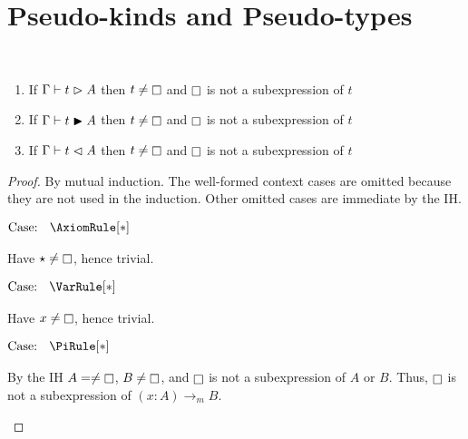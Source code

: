 \section{Pseudo-kinds and Pseudo-types}

\begin{lemma}
    \textcolor{white}{\_}
    \begin{enumerate}
        \item If $\Gamma \vdash t \vartriangleright A$ then $t \neq \kind$ and $\kind$ is not a subexpression of $t$
        \item If $\Gamma \vdash t \blacktriangleright A$ then $t \neq \kind$ and $\kind$ is not a subexpression of $t$
        \item If $\Gamma \vdash t \vartriangleleft A$ then $t \neq \kind$ and $\kind$ is not a subexpression of $t$
    \end{enumerate}
    \label{lem:2:kind_not_proof}
\end{lemma}
\begin{proof}
    By mutual induction.
    The well-formed context cases are omitted because they are not used in the induction.
    Other omitted cases are immediate by the IH.

    $\text{Case: }\begin{array}{c} \AxiomRule[*] \end{array}$
    \begin{proofcase}
        Have $\star \neq \kind$, hence trivial.
    \end{proofcase}

    $\text{Case: }\begin{array}{c} \VarRule[*] \end{array}$
    \begin{proofcase}
        Have $x \neq \kind$, hence trivial.
    \end{proofcase}

    $\text{Case: }\begin{array}{c} \PiRule[*] \end{array}$
    \begin{proofcase}
        By the IH $A = \neq \kind$, $B \neq \kind$, and $\kind$ is not a subexpression of $A$ or $B$.
        Thus, $\kind$ is not a subexpression of $(x : A) \to_m B$.
    \end{proofcase}
\end{proof}

